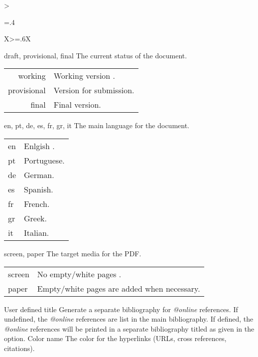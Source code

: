 {\begin{xltabular}{\linewidth}{>{\hsize=.4\hsize\raggedright\arraybackslash}X>{\hsize=.6\hsize}X}
    \midrule
    {draft, provisional, final}%
    {The current status of the document.}%
	{%
    \begin{tabular}{@{}r@{ $\rightarrow$ }X@{}}
         working      & Working version .\\
         provisional  & Version for submission.\\
         final        & Final version.\\
    \end{tabular}
    }
    \midrule
    {en, pt, de, es, fr, gr, it}%
    {The main language for the document.}%
	{%
    \begin{tabular}{@{}l@{ $\rightarrow$ }X@{}}
         en & Enlgish .\\
         pt & Portuguese.\\
         de & German.\\
         es & Spanish.\\
         fr & French.\\
         gr & Greek.\\
         it & Italian.\\
    \end{tabular}
    }
    \midrule
    {screen, paper}%
    {The target media for the PDF.}%
	{%
    \begin{tabular}{@{}l@{ $\rightarrow$ }X@{}}
         screen & No empty/white pages .\\
         paper  & Empty/white pages are added when necessary.\\
    \end{tabular}
    }
    \midrule
    {User defined title}%
    {Generate a separate bibliography for \emph{@online} references.}%
	{%
		If undefined, the \emph{@online} references are list in the main bibliography.  If defined, the \emph{@online} references will be printed in a separate bibliography titled as given in the option.
    }
    \midrule
    {Color name}%
    {The color for the hyperlinks (URLs, cross references, citations).}%

\end{xltabular}}

